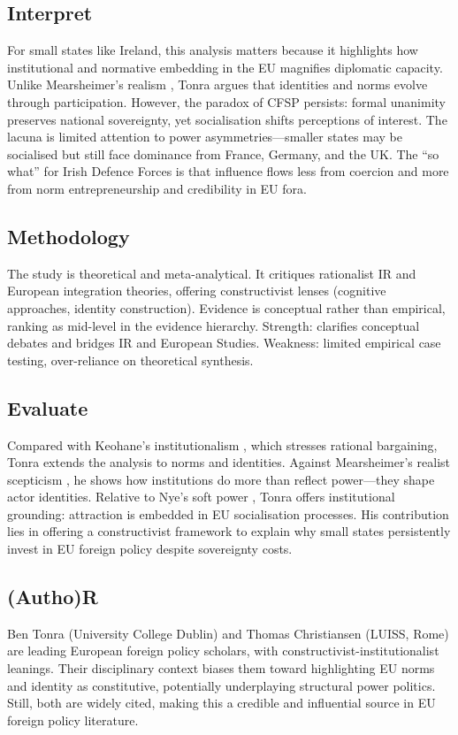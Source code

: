 \subsection*{Interpret}
For small states like Ireland, this analysis matters because it highlights how institutional and normative embedding in the EU magnifies diplomatic capacity. Unlike Mearsheimer’s realism \parencite{MEARSHEIMER_1994}, Tonra argues that identities and norms evolve through participation. However, the paradox of CFSP persists: formal unanimity preserves national sovereignty, yet socialisation shifts perceptions of interest. The lacuna is limited attention to power asymmetries—smaller states may be socialised but still face dominance from France, Germany, and the UK. The “so what” for Irish Defence Forces is that influence flows less from coercion and more from norm entrepreneurship and credibility in EU fora.

\subsection*{Methodology}
The study is theoretical and meta-analytical. It critiques rationalist IR and European integration theories, offering constructivist lenses (cognitive approaches, identity construction). Evidence is conceptual rather than empirical, ranking as mid-level in the evidence hierarchy. Strength: clarifies conceptual debates and bridges IR and European Studies. Weakness: limited empirical case testing, over-reliance on theoretical synthesis.

\subsection*{Evaluate}
Compared with Keohane’s institutionalism \parencite{KEOHANE_1988}, which stresses rational bargaining, Tonra extends the analysis to norms and identities. Against Mearsheimer’s realist scepticism \parencite{MEARSHEIMER_2019}, he shows how institutions do more than reflect power—they shape actor identities. Relative to Nye’s soft power \parencite{NYE_2008}, Tonra offers institutional grounding: attraction is embedded in EU socialisation processes. His contribution lies in offering a constructivist framework to explain why small states persistently invest in EU foreign policy despite sovereignty costs.

\subsection*{(Autho)R}
Ben Tonra (University College Dublin) and Thomas Christiansen (LUISS, Rome) are leading European foreign policy scholars, with constructivist-institutionalist leanings. Their disciplinary context biases them toward highlighting EU norms and identity as constitutive, potentially underplaying structural power politics. Still, both are widely cited, making this a credible and influential source in EU foreign policy literature.


